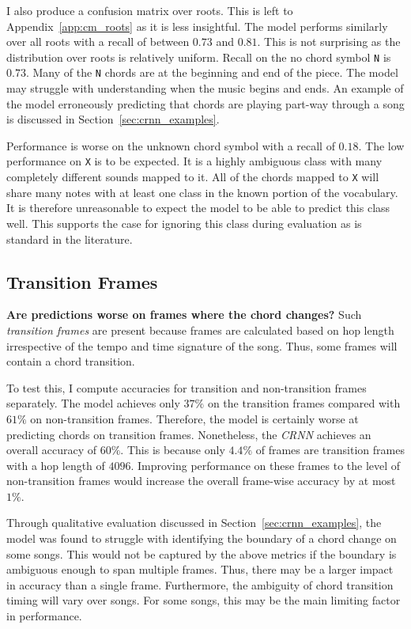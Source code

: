 I also produce a confusion matrix over roots. This is left to Appendix~\ref{app:cm_roots} as it is less insightful. The model performs similarly over all roots with a recall of between $0.73$ and $0.81$. This is not surprising as the distribution over roots is relatively uniform. Recall on the no chord symbol \texttt{N} is $0.73$. Many of the \texttt{N} chords are at the beginning and end of the piece. The model may struggle with understanding when the music begins and ends. An example of the model erroneously predicting that chords are playing part-way through a song is discussed in Section~\ref{sec:crnn_examples}.

Performance is worse on the unknown chord symbol with a recall of $0.18$. The low performance on \texttt{X} is to be expected. It is a highly ambiguous class with many completely different sounds mapped to it. All of the chords mapped to \texttt{X} will share many notes with at least one class in the known portion of the vocabulary. It is therefore unreasonable to expect the model to be able to predict this class well. This supports the case for ignoring this class during evaluation as is standard in the literature.

\subsection{Transition Frames}\label{sec:transition_frames}

\textbf{Are predictions worse on frames where the chord changes?} Such \emph{transition frames} are present because frames are calculated based on hop length irrespective of the tempo and time signature of the song. Thus, some frames will contain a chord transition. 

To test this, I compute accuracies for transition and non-transition frames separately. The model achieves only $37\%$ on the transition frames compared with $61\%$ on non-transition frames. Therefore, the model is certainly worse at predicting chords on transition frames. Nonetheless, the \emph{CRNN} achieves an overall accuracy of $60\%$. This is because only $4.4\%$ of frames are transition frames with a hop length of $4096$. Improving performance on these frames to the level of non-transition frames would increase the overall frame-wise accuracy by at most $1\%$. 

Through qualitative evaluation discussed in Section~\ref{sec:crnn_examples}, the model was found to struggle with identifying the boundary of a chord change on some songs. This would not be captured by the above metrics if the boundary is ambiguous enough to span multiple frames. Thus, there may be a larger impact in accuracy than a single frame. Furthermore, the ambiguity of chord transition timing will vary over songs. For some songs, this may be the main limiting factor in performance.

